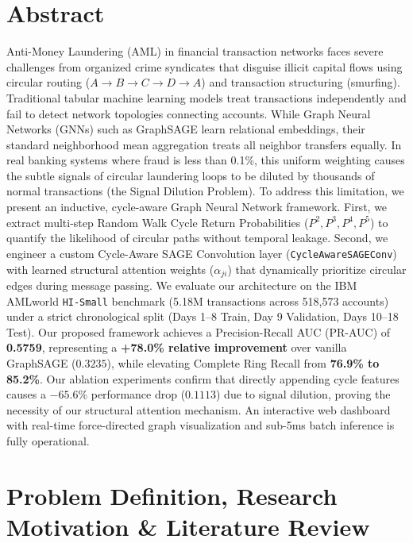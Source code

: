 \documentclass[11pt, a4paper]{article}
\begin{document}
\section{Abstract}
\noindent
Anti-Money Laundering (AML) in financial transaction networks faces severe challenges from organized crime syndicates that disguise illicit capital flows using circular routing ($A \to B \to C \to D \to A$) and transaction structuring (smurfing). Traditional tabular machine learning models treat transactions independently and fail to detect network topologies connecting accounts. While Graph Neural Networks (GNNs) such as GraphSAGE learn relational embeddings, their standard neighborhood mean aggregation treats all neighbor transfers equally. In real banking systems where fraud is less than 0.1\%, this uniform weighting causes the subtle signals of circular laundering loops to be diluted by thousands of normal transactions (the Signal Dilution Problem). To address this limitation, we present an inductive, cycle-aware Graph Neural Network framework. First, we extract multi-step Random Walk Cycle Return Probabilities ($P^2, P^3, P^4, P^5$) to quantify the likelihood of circular paths without temporal leakage. Second, we engineer a custom Cycle-Aware SAGE Convolution layer (\texttt{CycleAwareSAGEConv}) with learned structural attention weights ($\alpha_{ji}$) that dynamically prioritize circular edges during message passing. We evaluate our architecture on the IBM AMLworld \texttt{HI-Small} benchmark (5.18M transactions across 518,573 accounts) under a strict chronological split (Days 1--8 Train, Day 9 Validation, Days 10--18 Test). Our proposed framework achieves a Precision-Recall AUC (PR-AUC) of \textbf{0.5759}, representing a \textbf{+78.0\% relative improvement} over vanilla GraphSAGE ($0.3235$), while elevating Complete Ring Recall from \textbf{76.9\% to 85.2\%}. Our ablation experiments confirm that directly appending cycle features causes a $-65.6\%$ performance drop ($0.1113$) due to signal dilution, proving the necessity of our structural attention mechanism. An interactive web dashboard with real-time force-directed graph visualization and sub-5ms batch inference is fully operational.

\section{Problem Definition, Research Motivation \& Literature Review}
\end{document}
